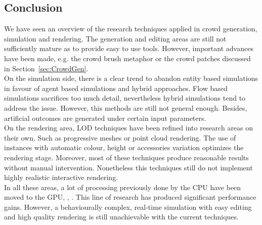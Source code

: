 \documentclass[6pt]{article} %
\begin{document}
\begin{multicols}{2}
\section{Conclusion}
We have seen an overview of the research techniques applied in crowd generation, simulation and rendering.
The generation and editing areas are still not sufficiently mature as to provide easy to use tools.
However, important advances have been made, e.g. the crowd brush metaphor or the crowd patches discussed in Section~\ref{sec:CrowdGen}.\\

On the simulation side, there is a clear trend to abandon entity based simulations in favour of agent based simulations and hybrid approaches.
Flow based simulations sacrifices too much detail, nevertheless hybrid simulations tend to address the issue.
However, this methods are still not general enough.
Besides, artificial outcomes are generated under certain input parameters.\\

On the rendering area, LOD techniques have been refined into research areas on their own.
Such as progressive meshes or point cloud rendering.
The use of instances with automatic colour, height or accessories variation optimizes the rendering stage.
Moreover, most of these techniques produce reasonable results without manual intervention.
Nonetheless this techniques still do not implement highly realistic interactive rendering.\\

In all these areas, a lot of processing previously done by the CPU have been moved to the GPU, \cite{Hu2009}, \cite{Millan2006}.
This line of research has produced significant performance gains.
However, a behaviourally complex, real-time simulation with easy editing and high quality rendering is still unachievable with the current techniques.

\end{multicols}
\end{document}
